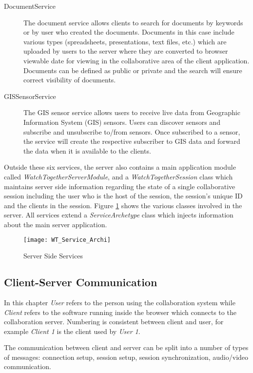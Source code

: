 \begin{description}
	\item[DocumentService] The document service allows clients to search for documents by keywords or by user who created the documents. Documents in this case include various types (spreadsheets, presentations, text files, etc.) which are uploaded by users to the server where they are converted to browser viewable date for viewing in the collaborative area of the client application. Documents can be defined as public or private and the search will ensure correct visibility of documents.
	\item[GISSensorService] The GIS sensor service allows users to receive live data from Geographic Information System (GIS) sensors. Users can discover sensors and subscribe and unsubscribe to/from sensors. Once subscribed to a sensor, the service will create the respective subscriber to GIS data and forward the data when it is available to the clients.
\end{description}

Outside these six services, the server also contains a main application module called \textit{WatchTogetherServerModule}, and a \textit{WatchTogetherSession} class which maintains server side information regarding the state of a single collaborative session including the user who is the host of the session, the session's unique ID and the clients in the session. Figure \ref{fig:wtcloudservices} shows the various classes involved in the server. All services extend a \textit{ServiceArchetype} class which injects information about the main server application.

\begin{figure}
	\centering
	\texttt{[image: WT\_Service\_Archi]}
	\caption{Server Side Services}
	\label{fig:wtcloudservices}
\end{figure}

\subsection{Client-Server Communication}

In this chapter \textit{User} refers to the person using the collaboration system while \textit{Client} refers to the software running inside the browser which connects to the collaboration server. Numbering is consistent between client and user, for example \textit{Client 1} is the client used by \textit{User 1}.

The communication between client and server can be split into a number of types of messages: connection setup, session setup, session synchronization, audio/video communication.

